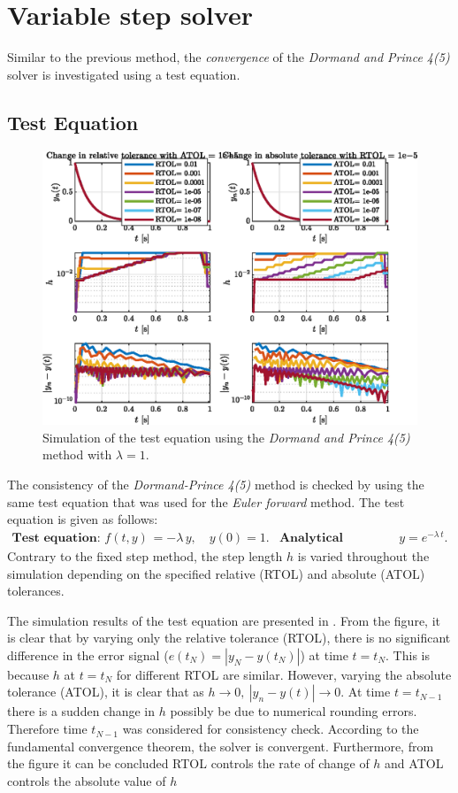 \section{Variable step solver}
Similar to the previous method, the \textit{convergence} of the \textit{Dormand and Prince 4(5)} solver is investigated using a test equation.
\subsection{Test Equation}
\begin{figure}[h!]
	\centering
	\includegraphics[width=\textwidth]{Figures/ode45_testCase.eps}
	\caption{Simulation of the test equation using the \textit{Dormand and Prince 4(5)} method with $\lambda=1$.}
	\label{fig:testode45}
\end{figure}
The consistency of the \textit{Dormand-Prince 4(5)} method is checked by using the same test equation that was used for the \textit{Euler forward} method. The test equation is given as follows:
\begin{align*}
	\textbf{Test equation: }f(t,y) &= -\lambda\,y, \quad y(0) = 1. & \textbf{Analytical solution: } & y = e^{-\lambda\,t}.
\end{align*}
Contrary to the fixed step method, the step length $h$ is varied throughout the simulation depending on the specified relative (RTOL) and absolute (ATOL) tolerances. 

The simulation results of the test equation are presented in . From the figure, it is clear that by varying only the relative tolerance (RTOL), there is no significant difference in the error signal ($e(t_N) = |y_N - y(t_N)|$) at time $t = t_N$. This is because $h$ at $t = t_N$ for different RTOL are similar. However, varying the absolute tolerance (ATOL), it is clear that as $h\rightarrow0,\ |y_n - y(t)| \rightarrow0$. At time $t = t_{N-1}$ there is a sudden change in $h$ possibly be due to numerical rounding errors. Therefore time $t_{N-1}$ was considered for consistency check. According to the fundamental convergence theorem, the solver is convergent. Furthermore, from the figure it can be concluded RTOL controls the rate of change of $h$ and ATOL controls the absolute value of $h$

